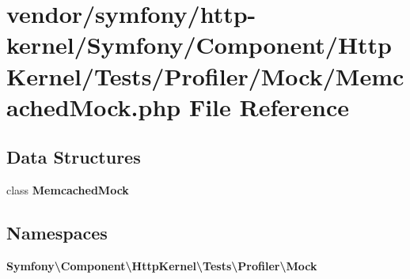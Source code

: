 \section{vendor/symfony/http-\/kernel/\+Symfony/\+Component/\+Http\+Kernel/\+Tests/\+Profiler/\+Mock/\+Memcached\+Mock.php File Reference}
\label{_memcached_mock_8php}
\subsection*{Data Structures}
\begin{DoxyCompactItemize}
\item 
class {\bf Memcached\+Mock}
\end{DoxyCompactItemize}
\subsection*{Namespaces}
\begin{DoxyCompactItemize}
\item 
 {\bf Symfony\textbackslash{}\+Component\textbackslash{}\+Http\+Kernel\textbackslash{}\+Tests\textbackslash{}\+Profiler\textbackslash{}\+Mock}
\end{DoxyCompactItemize}
